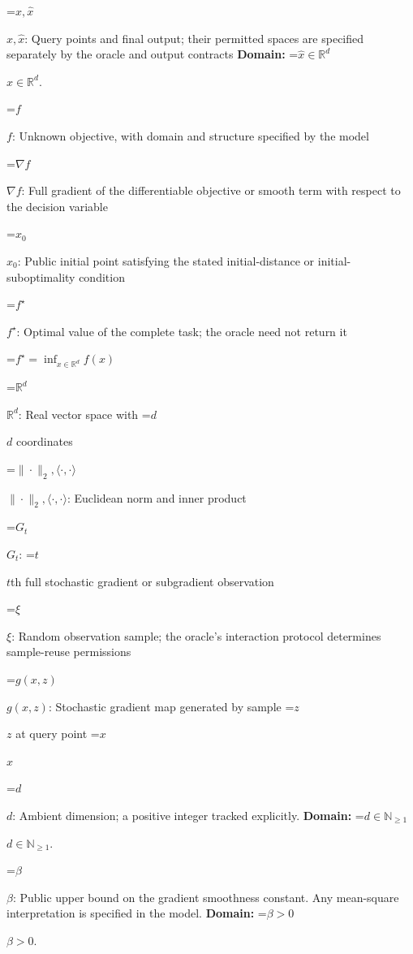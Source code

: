 \documentclass[10pt,a4paper]{article}
\newcommand{\AtlasMath}[1]{\par\begingroup\centering\setbox0=\hbox{$\displaystyle #1$}\ifdim\wd0>1.4\linewidth\typeout{ATLAS WIDE FORMULA: \the\wd0}\fi\ifdim\wd0>\linewidth\resizebox{\linewidth}{!}{\box0}\else\box0\fi\par\endgroup}
\newcommand{\AtlasInlineMath}[1]{\begingroup\setbox0=\hbox{$#1$}\ifdim\wd0>.4\linewidth\endgroup\AtlasMath{#1}\else\endgroup$#1$\fi}
\begin{document}
\AtlasInlineMath{x,\widehat{x}}: Query points and final output; their permitted spaces are specified separately by the oracle and output contracts \textbf{Domain:} \AtlasInlineMath{\widehat{x}\in \mathbb{R}^d}.



\AtlasInlineMath{f}: Unknown objective, with domain and structure specified by the model



\AtlasInlineMath{\nabla f}: Full gradient of the differentiable objective or smooth term with respect to the decision variable



\AtlasInlineMath{x_0}: Public initial point satisfying the stated initial-distance or initial-suboptimality condition



\AtlasInlineMath{f^\star}: Optimal value of the complete task; the oracle need not return it




\AtlasMath{f^\star=\inf_{x\in \mathbb{R}^d}f(x)}




\AtlasInlineMath{\mathbb{R}^d}: Real vector space with \AtlasInlineMath{d} coordinates



\AtlasInlineMath{\|\cdot\|_2,\langle\cdot,\cdot\rangle}: Euclidean norm and inner product



\AtlasInlineMath{G_t}: \AtlasInlineMath{t}th full stochastic gradient or subgradient observation



\AtlasInlineMath{\xi}: Random observation sample; the oracle's interaction protocol determines sample-reuse permissions



\AtlasInlineMath{g(x,z)}: Stochastic gradient map generated by sample \AtlasInlineMath{z} at query point \AtlasInlineMath{x}



\AtlasInlineMath{d}: Ambient dimension; a positive integer tracked explicitly. \textbf{Domain:} \AtlasInlineMath{d\in\mathbb{N}_{\ge1}}.



\AtlasInlineMath{\beta}: Public upper bound on the gradient smoothness constant. Any mean-square interpretation is specified in the model. \textbf{Domain:} \AtlasInlineMath{\beta>0}.
\end{document}
